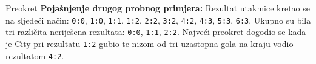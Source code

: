 \begin{statement}[
  problempoints=50,
  timelimit=1 sekunda,
  memorylimit=512 MiB,
]{Preokret}
\textbf{Pojašnjenje drugog probnog primjera:}
Rezultat utakmice kretao se na sljedeći način: \texttt{0:0}, \texttt{1:0},
\texttt{1:1}, \texttt{1:2}, \texttt{2:2}, \texttt{3:2}, \texttt{4:2},
\texttt{4:3}, \texttt{5:3}, \texttt{6:3}. Ukupno su bila tri različita
neriješena rezultata: \texttt{0:0}, \texttt{1:1}, \texttt{2:2}. Najveći
preokret dogodio se kada je City pri rezultatu \texttt{1:2} gubio te nizom od
tri uzastopna gola na kraju vodio rezultatom \texttt{4:2}.

\end{statement}

